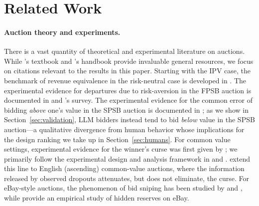 
\section{Related Work}\label{sec:related}

\paragraph{Auction theory and experiments.}
There is a vast quantity of theoretical and experimental literature on auctions. While \citet{krishna2009auction}'s textbook and \citet{kagel2020handbook}'s handbook provide invaluable general resources, we focus on citations relevant to the results in this paper.
Starting with the IPV case, the benchmark of revenue equivalence in the risk-neutral case is developed in \citet{myerson1981optimal}. The experimental evidence for departures due to risk-aversion in the FPSB auction is documented in \citet{coppinger1980incentives} and \citet{cox1988theory}'s survey. The experimental evidence for the common error of bidding \emph{above} one's value in the SPSB auction is documented in \citet{kagel1993independent}; as we show in Section~\ref{sec:validation}, LLM bidders instead tend to bid \emph{below} value in the SPSB auction---a qualitative divergence from human behavior whose implications for the design ranking we take up in Section~\ref{sec:humans}.
For common value settings, experimental evidence for the winner's curse was first given by \citet{bazerman1983won}; we primarily follow the experimental design and analysis framework in \citet{kagel1986winner} and \citet{kagel1987information}. \citet{levin1996revenue} extend this line to English (ascending) common-value auctions, where the information released by observed dropouts attenuates, but does not eliminate, the curse. For eBay-style auctions, the phenomenon of bid sniping has been studied by \citet{roth2002last} and \citet{ockenfels2006late}, while \citet{einav2011learning} provide an empirical study of hidden reserves on eBay.

